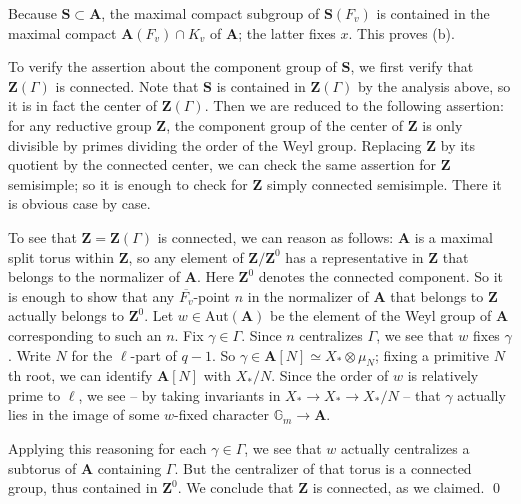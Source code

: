 \documentclass[10pt]{amsart}
\newcommand{\ZZ}{\mathbf{Z}}
\newcommand{\Aut}{\mathrm{Aut}}
\theoremstyle{remark}
\newcommand{\TT}{\mathbf{A}}
\begin{document}
  
  
Because $\mathbf{S} \subset \mathbf{A}$, the maximal compact subgroup 
 of $\mathbf{S}(F_v)$ is contained in the maximal compact $\mathbf{A}(F_v) \cap K_v$ of $\mathbf{A}$; the latter fixes $x$. This
 proves (b). 
  
  To verify the assertion about the component group of $\mathbf{S}$, we first verify that $\mathbf{Z}(\Gamma)$ is connected. 
  Note that $\mathbf{S}$ is contained in $\mathbf{Z}(\Gamma)$ by the analysis above, so it is in fact the center of $\mathbf{Z}(\Gamma)$. 
  Then we are reduced to the following assertion: 
 for any reductive group $\mathbf{Z}$, the component group of the center of $\mathbf{Z}$
  is only divisible by primes dividing the order of the Weyl group. Replacing $\mathbf{Z}$ by  
  its quotient by the connected center, we can check the same assertion for $\mathbf{Z}$ semisimple;
  so it is enough to check for $\mathbf{Z}$ simply connected semisimple. There it is obvious case by case. 
   
  To see that $\mathbf{Z}=\mathbf{Z}(\Gamma)  $ is connected, we can reason as follows:  $\mathbf{A}$ is a maximal split
  torus  within  $\mathbf{Z}$, so any element of $\mathbf{Z}/\mathbf{Z}^0$ has a representative in $\mathbf{Z}$  that belongs to the normalizer of $\mathbf{A}$.
  Here $\mathbf{Z}^0$ denotes the connected component.
  So it is enough to show that any  $\overline{F_v}$-point $n$ in the normalizer of $\mathbf{A}$ that belongs to $\ZZ$ actually belongs to $\ZZ^0$.
  Let $w \in \Aut(\mathbf{A})$ be the  element of the Weyl group of $\mathbf{A}$ corresponding to such an $n$. 
  Fix $\gamma \in \Gamma$. Since $n$ centralizes $\Gamma$, we see that 
  $w$ fixes $\gamma$. 
Write $N$ for the $\ell$-part of $q-1$. So $\gamma \in \mathbf{A}[N] \simeq X_* \otimes \mu_{N}$;
  fixing a primitive $N$th root, we can identify $\mathbf{A}[N]$ with $X_*/N$. 
  Since the order of $w$ is relatively prime to $\ell$, we see -- by taking invariants in $X_* \rightarrow X_* \rightarrow X_*/N$ --
  that $\gamma$ actually lies in the image of some $w$-fixed character $\mathbb{G}_m \rightarrow \TT$.   
 
  Applying this reasoning for each $\gamma \in \Gamma$,
  we see that $w$ actually  centralizes a subtorus of $\TT$ containing $\Gamma$. But the centralizer of that torus
  is a connected group, thus contained in $\mathbf{Z}^0$.  We conclude that $\mathbf{Z}$ is connected, as we claimed. 
  \qed 



%
%
%
%
%
%
%
 
\end{document}
